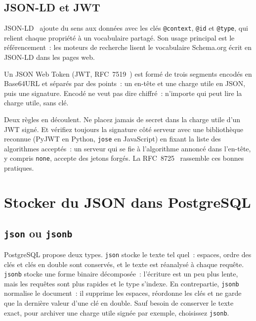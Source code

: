 \documentclass[12pt,a4paper]{article}
\newcommand{\exemple}[3][]{%
  \par\addvspace{6pt}\noindent\begin{minipage}{\linewidth}%
  \end{minipage}\par\addvspace{6pt}}
\begin{document}
\exemple[language=json]{json/mesures.jsonl}{Fichier JSON Lines}

\exemple[language=python]{python/08_jsonl.py}{Lire un fichier JSON Lines en Python et avec pandas}

\subsection{JSON-LD et JWT}
JSON-LD~\cite{kellogg2020jsonld} ajoute du sens aux données avec les clés \texttt{@context}, \texttt{@id} et \texttt{@type}, qui relient chaque propriété à un vocabulaire partagé. Son usage principal est le référencement~: les moteurs de recherche lisent le vocabulaire Schema.org écrit en JSON-LD dans les pages web.

Un JSON Web Token (JWT, RFC~7519~\cite{jones2015rfc7519}) est formé de trois segments encodés en Base64URL et séparés par des points~: un en-tête et une charge utile en JSON, puis une signature. Encodé ne veut pas dire chiffré~: n'importe qui peut lire la charge utile, sans clé.

\exemple[language=python]{python/10_jwt.py}{Lire la charge utile d'un JWT sans aucune clé}

Deux règles en découlent. Ne placez jamais de secret dans la charge utile d'un JWT signé. Et vérifiez toujours la signature côté serveur avec une bibliothèque reconnue (PyJWT en Python, \texttt{jose} en JavaScript) en fixant la liste des algorithmes acceptés~: un serveur qui se fie à l'algorithme annoncé dans l'en-tête, y compris \texttt{none}, accepte des jetons forgés. La RFC~8725~\cite{sheffer2020rfc8725} rassemble ces bonnes pratiques.

\section{Stocker du JSON dans PostgreSQL}
\label{sec:sql}

\subsection{\texttt{json} ou \texttt{jsonb}}
PostgreSQL propose deux types. \texttt{json} stocke le texte tel quel~: espaces, ordre des clés et clés en double sont conservés, et le texte est réanalysé à chaque requête. \texttt{jsonb} stocke une forme binaire décomposée~: l'écriture est un peu plus lente, mais les requêtes sont plus rapides et le type s'indexe. En contrepartie, \texttt{jsonb} normalise le document~: il supprime les espaces, réordonne les clés et ne garde que la dernière valeur d'une clé en double. Sauf besoin de conserver le texte exact, pour archiver une charge utile signée par exemple, choisissez \texttt{jsonb}.
\end{document}

